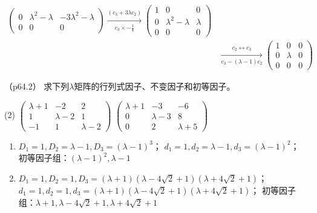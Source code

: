 \documentclass[12pt, a4paper, oneside, UTF8]{ctexbook}
\begin{document}
\begin{solution}
\begin{align*}
\begin{pmatrix}
            0 & \lambda^2-\lambda & -3\lambda^2-\lambda \\
            0 & 0& 0 
        \end{pmatrix}
        \xrightarrow[c_3 \times -\frac{1}{4}]{(c_3+3\lambda c_2)}
        \begin{pmatrix}
            1 & 0 &0 \\
            0 & \lambda^2-\lambda & \lambda \\
            0 & 0& 0 
        \end{pmatrix} \\
        &\xrightarrow[c_3-(\lambda-1) c_2 ]{c_2 \leftrightarrow c_3}
        \begin{pmatrix}
            1 & 0 &0 \\
            0 & \lambda & 0\\
            0 & 0& 0 
        \end{pmatrix}
    \end{align*}
\end{solution}

\begin{question}（p64.2）
    求下列$\lambda$矩阵的行列式因子、不变因子和初等因子。
    \begin{tasks}[label=(\arabic*)](2)
        \task $\begin{pmatrix}
            \lambda+1 & -2 & 2 \\
            1 & \lambda-2 & 1\\
            -1 & 1& \lambda-2
        \end{pmatrix}$
        \task $\begin{pmatrix}
            \lambda+1 & -3 & -6 \\
            0 & \lambda-3 & 8\\
            0 & 2& \lambda+5
        \end{pmatrix}$
    \end{tasks}
\end{question}

\begin{solution}
    \begin{enumerate}[label=(\arabic*)]
        \item 
        $D_1=1,D_2=\lambda-1,D_3=(\lambda-1)^3$；
        $d_1=1,d_2=\lambda-1,d_3=(\lambda-1)^2$；
        初等因子组：$(\lambda-1)^2,\lambda-1$
        \item $D_1=1,D_2=1,D_3=(\lambda+1)(\lambda-4\sqrt{2}+1)(\lambda+4\sqrt{2}+1)$；
        $d_1=1,d_2=1,d_3=(\lambda+1)(\lambda-4\sqrt{2}+1)(\lambda+4\sqrt{2}+1)$；
        初等因子组：$\lambda+1,\lambda-4\sqrt{2}+1,\lambda+4\sqrt{2}+1$
    \end{enumerate}
\end{solution}
\end{document}
